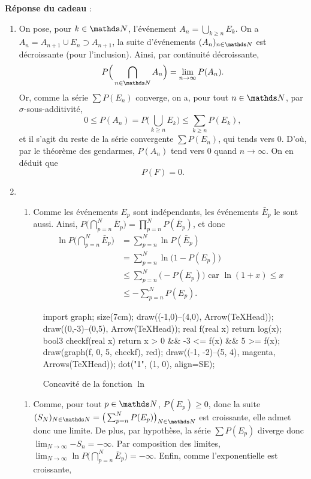 \documentclass[a4paper]{article}
\begin{document}
	\textbf{Réponse du cadeau} :\\
	\begin{enumerate}
		\item On pose, pour $k \in \N$, l'événement $A_n = \bigcup_{k \ge n} E_k$.
		On a $A_n = A_{n+1} \cup E_n \supset A_{n+1}$, la suite d'événements $(A_n)_{n \in \N}$\/ est décroissante (pour l'inclusion). Ainsi, par continuité décroissante, \[
			P\Big(\bigcap_{n\in \N} A_n\Big) = \lim_{n\to \infty} P(A_n)
		.\] Or, comme la série $\sum P(E_n)$\/ converge, on a, pour tout $n \in \N$, par $\sigma$-sous-additivité, \[
			0 \le P(A_n) = P\Big( \bigcup_{k \ge n} E_k \Big) \le \sum_{k \ge n} P(E_k),
		\] et il s'agit du reste de la série convergente $\sum P(E_n)$, qui tends vers 0. D'où, par le théorème des gendarmes, $P(A_n)$\/ tend vers 0 quand $n \to \infty$. On en déduit que \[
			\boxed{P(F) = 0.}
		\]
		\item
			\begin{enumerate}
				\item Comme les événements $E_p$\/ sont indépendants, les événements $\bar{E}_p$\/ le sont aussi. Ainsi, $P\big(\bigcap_{p=n}^N \bar{E}_p\big) = \prod_{p=n}^N P(\bar{E}_p)$, et donc
					\begin{align*}
						\ln P\Big(\bigcap_{p=n}^N \bar{E}_p\Big) &= \sum_{p=n}^N \ln P(\bar{E}_p)\\
						&= \sum_{p=n}^N \ln\big(1 - P(E_p)\big)\\
						&\le \sum_{p=n}^N \big(-P(E_p)\big) \text{ car } \ln (1+x) \le x \\
						&\le -\sum_{p=n}^N P(E_p).
					\end{align*}
			\end{enumerate}
			\begin{figure}[H]
				\centering
				\begin{asy}
					import graph;
					size(7cm);
					draw((-1,0)--(4,0), Arrow(TeXHead));
					draw((0,-3)--(0,5), Arrow(TeXHead));
					real f(real x) { return log(x); }
					bool3 checkf(real x) { return x > 0 && -3 <= f(x) && 5 >= f(x); }
					draw(graph(f, 0, 5, checkf), red);
					draw((-1, -2)--(5, 4), magenta, Arrows(TeXHead));
					dot("1", (1, 0), align=SE);
				\end{asy}
				\caption{Concavité de la fonction $\ln$\/ }
			\end{figure}
			\begin{enumerate}[start=2]
				\item Comme, pour tout $p \in \N$, $P(E_p)\ge 0$, donc la suite $(S_N)_{N \in \N} = \big(\sum_{p=n}^N P(E_p)\big)_{N \in \N}$\/ est croissante, elle admet donc une limite. De plus, par hypothèse, la série $\sum P(E_p)$\/ diverge donc $\lim_{N\to \infty} {-S_n} = -\infty$. Par composition des limites, $\lim_{N\to \infty} \ln P\big(\bigcap_{p=n}^N \bar{E}_p\big) = -\infty$. Enfin, comme l'exponentielle est croissante, \[
\]
\end{enumerate}
\end{enumerate}
\end{document}
